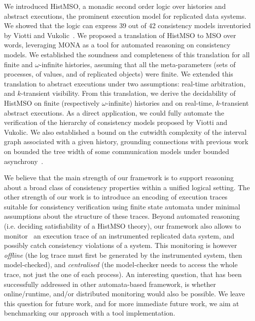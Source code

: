 We introduced HistMSO, a monadic second order logic over histories and abstract executions, the prominent execution model for replicated data systems. 
We showed that the logic can express 39 out of 42 consistency models inventoried by Viotti and Vukolic~\cite{ViottiVukolic}. 
We proposed a translation of HistMSO to MSO over words, leveraging MONA as a tool for automated reasoning on consistency models.
We established the soundness and completeness of this translation for all finite and $\omega$-infinite histories, assuming that all the meta-parameters (sets of processes, of values, and of replicated objects) were finite.
We extended this translation to abstract executions under two assumptions: real-time arbitration, and $k$-transient visibility.
From this translation, we derive the decidability of HistMSO on finite (respectively $\omega$-infinite) histories and on real-time, $k$-transient abstract executions.
As a direct application, we could fully automate the verification of the hierarchy of consistency models proposed by Viotti and Vukolic.
We also established a bound on the cutwidth complexity of the interval graph associated with a given history, grounding connections with previous work on bounded the tree width of some communication models under bounded asynchrony~\cite{DBLP:journals/pacmpl/GiustoFLL23}.

We believe that the main strength of our framework is to support reasoning about a broad class of consistency properties within a unified logical setting.
The other strength of our work is to introduce an encoding of execution traces suitable for consistency verification using finite state automata under minimal assumptions about the structure of these traces.
Beyond automated reasoning (i.e. deciding satisfiability of a HistMSO theory), our framework also allows to monitor~\cite{havelund2018runtime} an execution trace of an instrumented replicated data system, and possibly catch consistency violations of a system.
This monitoring is however \emph{offline} (the log trace must first be generated by the instrumented system, then model-checked), and \emph{centralised} (the model-checker needs to access the whole trace, not just the one of each process).
An interesting question, that has been successfully addressed in other automata-based framework, is whether online/runtime, and/or distributed monitoring would also be possible. We leave this question for future work, and for more immediate future work, we aim at benchmarking our approach with a tool implementation.


